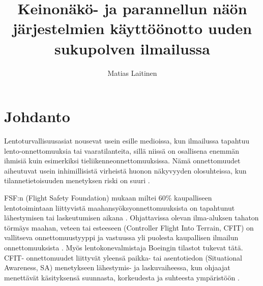 \documentclass[utf8,bachelor,manualbib]{gradu3}
\begin{document}
\title{Keinonäkö- ja parannellun näön järjestelmien käyttöönotto uuden sukupolven ilmailussa}



\author{Matias Laitinen}

\maketitle
  
\mainmatter

\chapter{Johdanto}

Lentoturvallisuusasiat nousevat usein esille medioissa, kun ilmailussa tapahtuu lento-onnettomuuksia tai vaaratilanteita, sillä niissä on osallisena enemmän ihmisiä kuin esimerkiksi tieliikenneonnettomuuksissa. Nämä onnettomuudet aiheutuvat usein inhimillisistä virheistä huonon näkyvyyden olosuhteissa, kun tilannetietoisuuden menetyksen riski on suuri \citep{kimkaber2014, prinzelym2013, schnellym2004, vygolov2013}.

FSF:n (Flight Safety Foundation) mukaan miltei 60\% kaupalliseen lentotoimintaan liittyvistä maahansyöksyonnettomuuksista on tapahtunut lähestymisen tai laskeutumisen aikana \cite{schnellym2004, kimkaber2014}. Ohjattavissa olevan ilma-aluksen tahaton törmäys maahan, veteen tai esteeseen (Controller Flight Into Terrain, CFIT) on vallitseva onnettomuustyyppi ja vastuussa yli puolesta kaupallisen ilmailun onnettomuuksista \citep{etherington2000}. Myös lentokonevalmistaja Boeingin \citeyearpar{boeing1996} tilastot tukevat tätä. CFIT- onnettomuudet liittyvät yleensä paikka- tai asentotiedon (Situational Awareness, SA) menetykseen lähestymis- ja laskuvaiheessa, kun ohjaajat menettävät käsityksensä suunnasta, korkeudesta ja suhteesta ympäristöön \cite{schnellym2004}.
\end{document}
